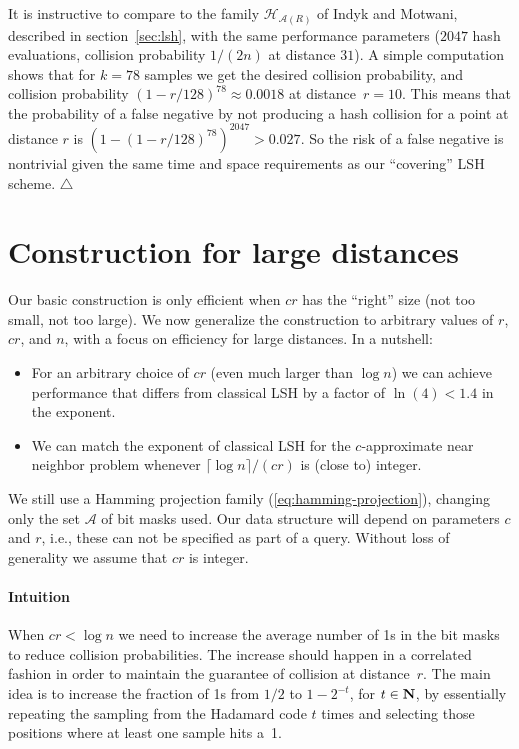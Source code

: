 \documentclass[prodmode,acmtalg]{acmsmall}
\begin{document}
It is instructive to compare to the family $\mathcal{H}_{\mathcal{A}(R)}$ of Indyk and Motwani, described in section~\ref{sec:lsh}, with the same performance parameters ($2047$ hash evaluations, collision probability $1/(2n)$ at distance $31$).
A simple computation shows that for $k=78$ samples we get the desired collision probability, and collision probability $(1-r/128)^{78} \approx 0.0018$ at distance~$r=10$.
This means that the probability of a false negative by not producing a hash collision for a point at distance $r$ is $(1-(1-r/128)^{78})^{2047} > 0.027$.
So the risk of a false negative is nontrivial given the same time and space requirements as our ``covering'' LSH scheme. $\triangle$







\section{Construction for large distances}\label{sec:large}

Our basic construction is only efficient when $cr$ has the ``right'' size (not too small, not too large). 
We now generalize the construction to arbitrary values of $r$, $cr$, and $n$, with a focus on efficiency for large distances. 
In a nutshell:
\begin{itemize}
\item For an arbitrary choice of $cr$ (even much larger than $\log n$) we can achieve performance that differs from classical LSH by a factor of $\ln(4) < 1.4$ in the exponent.\item We can match the exponent of classical LSH for the $c$-approximate near neighbor problem whenever $\lceil\log n\rceil/(cr)$ is (close to) integer.
\end{itemize}
\noindent
We still use a Hamming projection family (\ref{eq:hamming-projection}), changing only the set $\mathcal{A}$ of bit masks used.
Our data structure will depend on parameters $c$ and $r$, i.e., these can not be specified as part of a query.
Without loss of generality we assume that $cr$ is integer.

\medskip

\paragraph{Intuition}
When $cr < \log n$ we need to increase the average number of 1s in the bit masks to reduce collision probabilities.
The increase should happen in a correlated fashion in order to maintain the guarantee of collision at distance~$r$.
The main idea is to increase the fraction of 1s from $1/2$ to $1-2^{-t}$, for $t\in{\bf N}$, by essentially repeating the sampling from the Hadamard code $t$ times and selecting those positions where at least one sample hits a~1. 
\end{document}
